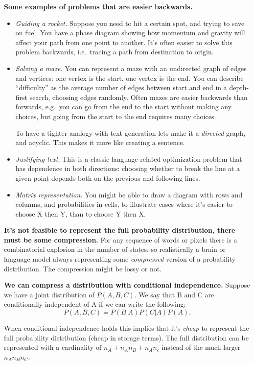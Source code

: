 \documentclass[
  11pt,
  letterpaper,
  DIV=11,
  numbers=noendperiod,
  oneside]{scrartcl}
\begin{document}
\textbf{Some examples of problems that are easier backwards.}

\begin{itemize}
\item
  \emph{Guiding a rocket.} Suppose you need to hit a certain spot, and
  trying to save on fuel. You have a phase diagram showing how momentum
  and gravity will affect your path from one point to another. It's
  often easier to solve this problem backwards, i.e.~tracing a path from
  destination to origin.
\item
  \emph{Solving a maze.} You can represent a maze with an undirected
  graph of edges and vertices: one vertex is the start, one vertex is
  the end. You can describe ``difficulty'' as the average number of
  edges between start and end in a depth-first search, choosing edges
  randomly. Often mazes are easier backwards than forwards, e.g.~you can
  go from the end to the start without making any choices, but going
  from the start to the end requires many choices.

  To have a tighter analogy with text generation lets make it a
  \emph{directed} graph, and acyclic. This makes it more like creating a
  sentence.
\item
  \emph{Justifying text.} This is a classic language-related
  optimization problem that has dependence in both directions: choosing
  whether to break the line at a given point depends both on the
  previous and following lines.
\item
  \emph{Matrix representation.} You might be able to draw a diagram with
  rows and columns, and probabilities in cells, to illustrate cases
  where it's easier to choose X then Y, than to choose Y then X.
\end{itemize}

\textbf{It's not feasible to represent the full probability
distribution, there must be some compression.} For any sequence of words
or pixels there is a combinatorial explosion in the number of states, so
realistically a brain or language model always representing some
\emph{compressed} version of a probability distribution. The compression
might be lossy or not.

\textbf{We can compress a distribution with conditional independence.}
Suppose we have a joint distribution of \(P(A,B,C)\). We say that B and
C are conditionally independent of A if we can write the following:
\[P(A,B,C)=P(B|A)P(C|A)P(A).\]

When conditional independence holds this implies that it's \emph{cheap}
to represent the full probability distribution (cheap in storage terms).
The full distribution can be represented with a cardinality of
\(n_A+n_An_B+n_An_c\) instead of the much larger \(n_An_Bn_C\).
\end{document}
